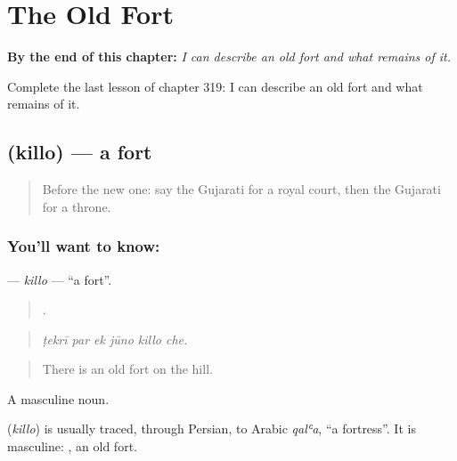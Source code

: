 
\chapter{The Old Fort}
\label{ch:gu-the-old-fort}

\begin{chapteropening}
\textbf{By the end of this chapter:} \emph{I can describe an old fort and what remains of it.}

Complete the last lesson of chapter 319: I can describe an old fort and what remains of it.
\end{chapteropening}

\section[\texorpdfstring{\gu{કિલ્લો} (killo)}{કિલ્લો (killo)}]{ (killo) — a fort}

\label{lesson:GU-C319-killo}



\begin{quote}
Before the new one: say the Gujarati for a royal court, then the Gujarati for a throne.
\end{quote}

\subsection*{You'll want to know: }
\textbf{} — \emph{killo} — \textquotedblleft{}a fort\textquotedblright{}.

\begin{quote}
     .
\end{quote}

\begin{quote}
\emph{ṭekrī par ek jūno killo che.}
\end{quote}

\begin{quote}
There is an old fort on the hill.
\end{quote}

A masculine noun.

\begin{cousinweb}
\textbf{} (\emph{killo}) is usually traced, through Persian, to Arabic \emph{qalʿa}, \textquotedblleft{}a fortress\textquotedblright{}. It is masculine: \textbf{ }, an old fort.
\end{cousinweb}

